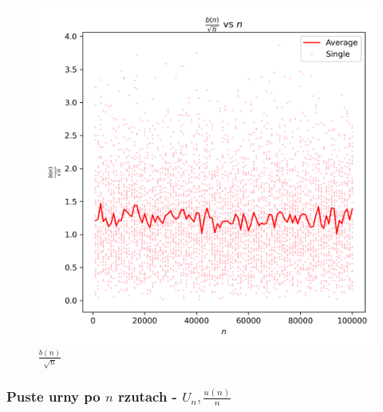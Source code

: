 \documentclass{article}
\begin{document}
\begin{figure}[H]
\begin{minipage}{0.24\textwidth}
        \caption{$\frac{b(n)}{n}$}
    \end{minipage}
    \begin{minipage}{0.24\textwidth}
        \centering
        \includegraphics[width=\linewidth]{graphs/b_factor_over_sqrt_n_vs_n.png}
        \caption{$\frac{b(n)}{\sqrt{n}}$}
    \end{minipage}
\end{figure}


\subsubsection{Puste urny po $n$ rzutach - $U_n, \frac{u(n)}{n}$}
\end{document}
